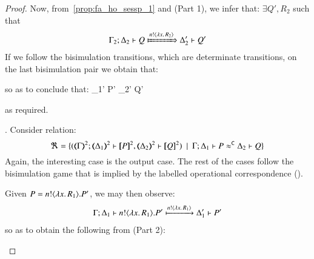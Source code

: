 \begin{proof}
	\mhorel	{\mapt{\Gamma}}
		{}
		{}
		{\fwb}
		{}
		{}
		{}

	\noi Now, from~\eqref{prop:fa_ho_sessp_1} and   (Part 1), we infer that:
	$\exists Q', R_2$ such that
%
	\begin{eqnarray*}
		\Gamma_2; \Delta_2 \proves Q \Hby{\bactout{n}{\abs{x}{R_2}}} \Delta_2' \proves Q'
	\end{eqnarray*}
%
	If we follow the bisimulation transitions, which are determinate transitions, on the last bisimulation pair we obtain that:
	
	\mhorel	{\mapt{\Gamma}}
		{}
		{ \Par {} }
		{\fwb}
		{}
		{}
		{ \Par {}  }

	\noi so as to conclude that:
	\mhorel	{\Gamma}
		{\Delta_1'}
		{P' \Par {} }
		{\Re}
		{\Delta_2'}
		{}
		{Q' \Par {}  }

	\noi as required.

\bigskip

	. Consider relation:
	\[
		\Re = \set{ (\horel{\mapt{\Gamma}^{2}}{\mapt{\Delta_1}^2}{\pmap{P}{2}}{,}{\mapt{\Delta_2}^2}{\pmap{Q}{2}}) \setbar \horel{\Gamma}{\Delta_1}{P}{\fwb}{\Delta_2}{Q}}
	\]
%
	Again, the interesting case is the output case. The rest of the cases follow
	the bisimulation game that is implied by the labelled operational correspondence
	(). 

	\noi Given $P = n ! \langle \lambda x.\,R_1 \rangle . P'$, we may then observe:
	\begin{eqnarray*}
		\Gamma; \Delta_1 \vdash n ! \langle \lambda x.\,R_1 \rangle . P'
		\xmapsto{n !\langle \lambda x.\,R_1 \rangle}
		\Delta_1' \vdash P'
	\end{eqnarray*}
%
	so as to obtain the following from  (Part 2):

	\mhorel	{\mapt{\Gamma}}
		{}
		{  \Par \repl {}  }
		{}
		{}
		{}
		{ \Par \repl {}  }


\end{proof}
